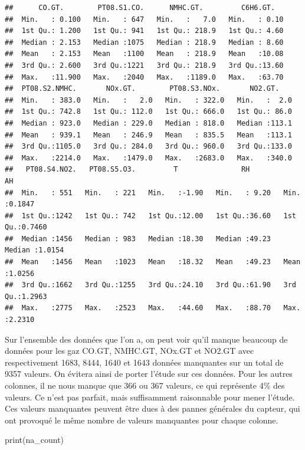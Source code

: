 \documentclass[
]{article}
\newenvironment{Shaded}{\begin{snugshade}}{\end{snugshade}}
\newcommand{\FunctionTok}[1]{\textcolor[rgb]{0.00,0.00,0.00}{#1}}
\newcommand{\NormalTok}[1]{#1}
\begin{document}
\begin{verbatim}
##      CO.GT.        PT08.S1.CO.      NMHC.GT.         C6H6.GT.    
##  Min.   : 0.100   Min.   : 647   Min.   :   7.0   Min.   : 0.10  
##  1st Qu.: 1.200   1st Qu.: 941   1st Qu.: 218.9   1st Qu.: 4.60  
##  Median : 2.153   Median :1075   Median : 218.9   Median : 8.60  
##  Mean   : 2.153   Mean   :1100   Mean   : 218.9   Mean   :10.08  
##  3rd Qu.: 2.600   3rd Qu.:1221   3rd Qu.: 218.9   3rd Qu.:13.60  
##  Max.   :11.900   Max.   :2040   Max.   :1189.0   Max.   :63.70  
##  PT08.S2.NMHC.       NOx.GT.        PT08.S3.NOx.       NO2.GT.     
##  Min.   : 383.0   Min.   :   2.0   Min.   : 322.0   Min.   :  2.0  
##  1st Qu.: 742.8   1st Qu.: 112.0   1st Qu.: 666.0   1st Qu.: 86.0  
##  Median : 923.0   Median : 229.0   Median : 818.0   Median :113.1  
##  Mean   : 939.1   Mean   : 246.9   Mean   : 835.5   Mean   :113.1  
##  3rd Qu.:1105.0   3rd Qu.: 284.0   3rd Qu.: 960.0   3rd Qu.:133.0  
##  Max.   :2214.0   Max.   :1479.0   Max.   :2683.0   Max.   :340.0  
##   PT08.S4.NO2.   PT08.S5.O3.         T               RH              AH        
##  Min.   : 551   Min.   : 221   Min.   :-1.90   Min.   : 9.20   Min.   :0.1847  
##  1st Qu.:1242   1st Qu.: 742   1st Qu.:12.00   1st Qu.:36.60   1st Qu.:0.7460  
##  Median :1456   Median : 983   Median :18.30   Median :49.23   Median :1.0154  
##  Mean   :1456   Mean   :1023   Mean   :18.32   Mean   :49.23   Mean   :1.0256  
##  3rd Qu.:1662   3rd Qu.:1255   3rd Qu.:24.10   3rd Qu.:61.90   3rd Qu.:1.2963  
##  Max.   :2775   Max.   :2523   Max.   :44.60   Max.   :88.70   Max.   :2.2310
\end{verbatim}

Sur l'ensemble des données que l'on a, on peut voir qu'il manque
beaucoup de données pour les gaz CO.GT, NMHC.GT, NOx.GT et NO2.GT avec
respectivement 1683, 8444, 1640 et 1643 données manquantes sur un total
de 9357 valeurs. On évitera ainsi de porter l'étude sur ces données.
Pour les autres colonnes, il ne nous manque que 366 ou 367 valeurs, ce
qui représente 4\% des valeurs. Ce n'est pas parfait, mais suffisamment
raisonnable pour mener l'étude. Ces valeurs manquantes peuvent être dues
à des pannes générales du capteur, qui ont provoqué le même nombre de
valeurs manquantes pour chaque colonne.

\begin{Shaded}
\begin{Highlighting}[]
\FunctionTok{print}\NormalTok{(na\_count)}
\end{Highlighting}
\end{Shaded}
\end{document}
